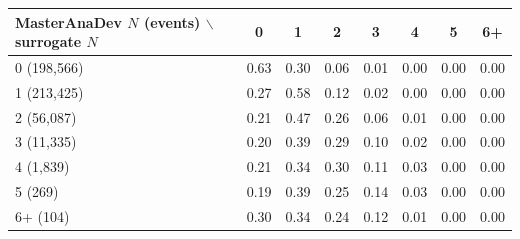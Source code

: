 \begin{tabular}{lccccccc}
\toprule
MasterAnaDev $N$ (events) $\backslash$ surrogate $N$ & 0 & 1 & 2 & 3 & 4 & 5 & 6+ \\
\midrule
0 (198,566) & 0.63 & 0.30 & 0.06 & 0.01 & 0.00 & 0.00 & 0.00 \\
1 (213,425) & 0.27 & 0.58 & 0.12 & 0.02 & 0.00 & 0.00 & 0.00 \\
2 (56,087) & 0.21 & 0.47 & 0.26 & 0.06 & 0.01 & 0.00 & 0.00 \\
3 (11,335) & 0.20 & 0.39 & 0.29 & 0.10 & 0.02 & 0.00 & 0.00 \\
4 (1,839) & 0.21 & 0.34 & 0.30 & 0.11 & 0.03 & 0.00 & 0.00 \\
5 (269) & 0.19 & 0.39 & 0.25 & 0.14 & 0.03 & 0.00 & 0.00 \\
6+ (104) & 0.30 & 0.34 & 0.24 & 0.12 & 0.01 & 0.00 & 0.00 \\
\bottomrule
\end{tabular}
